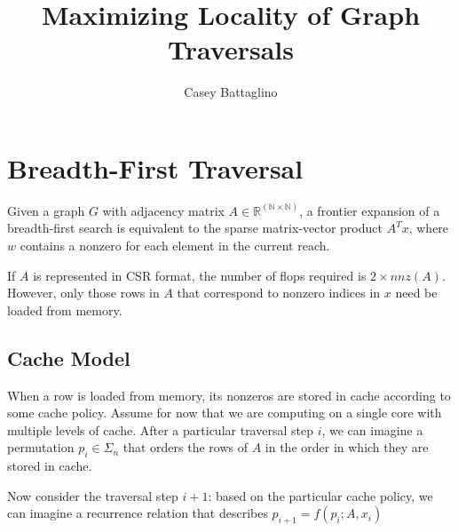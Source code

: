 \documentclass[11pt]{article}
\title{Maximizing Locality of Graph Traversals}
\author{Casey Battaglino}
\date{}
\begin{document}
\maketitle

\section{Breadth-First Traversal}

Given a graph $G$ with adjacency matrix $A \in \mathbb{R^{(N \times N)}}$, a frontier expansion of a breadth-first search is equivalent to the sparse matrix-vector product $A^Tx$, where $w$ contains a nonzero for each element in the current reach. 

If $A$ is represented in CSR format, the number of flops required is $2 \times nnz(A)$. However, only those rows in $A$ that correspond to nonzero indices in $x$ need be loaded from memory. 

\subsection{Cache Model}
When a row is loaded from memory, its nonzeros are stored in cache according to some cache policy. Assume for now that we are computing on a single core with multiple levels of cache. After a particular traversal step $i$, we can imagine a permutation $p_i \in \Sigma_n$ that orders the rows of $A$ in the order in which they are stored in cache. 

Now consider the traversal step $i+1$: based on the particular cache policy, we can imagine a recurrence relation that describes $p_{i+1}=f(p_i; A, x_i)$






\end{document}
